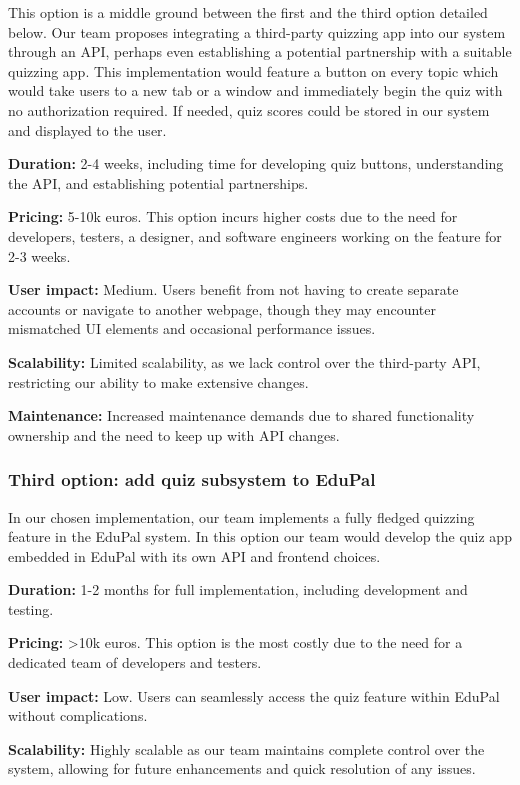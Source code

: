 \documentclass[
    english, %
]{VUMIFPSkursinis}
\begin{document}
This option is a middle ground between the first and the third option detailed below. Our team proposes integrating a third-party quizzing app into our system through an API, perhaps even establishing a potential partnership with a suitable quizzing app. This implementation would feature a button on every topic which would take users to a new tab or a window and immediately begin the quiz with no authorization required. If needed, quiz scores could be stored in our system and displayed to the user. 

\textbf{Duration:} 2-4 weeks, including time for developing quiz buttons, understanding the API, and establishing potential partnerships.

\textbf{Pricing:} 5-10k euros. This option incurs higher costs due to the need for developers, testers, a designer, and software engineers working on the feature for 2-3 weeks.

\textbf{User impact:} Medium. Users benefit from not having to create separate accounts or navigate to another webpage, though they may encounter mismatched UI elements and occasional performance issues.

\textbf{Scalability:} Limited scalability, as we lack control over the third-party API, restricting our ability to make extensive changes.

\textbf{Maintenance:} Increased maintenance demands due to shared functionality ownership and the need to keep up with API changes.

\subsubsection{Third option: add quiz subsystem to EduPal}

In our chosen implementation, our team implements a fully fledged quizzing feature in the EduPal system. In this option our team would develop the quiz app embedded in EduPal with its own API and frontend choices. 

\textbf{Duration:} 1-2 months for full implementation, including development and testing.

\textbf{Pricing:} >10k euros. This option is the most costly due to the need for a dedicated team of developers and testers.

\textbf{User impact:} Low. Users can seamlessly access the quiz feature within EduPal without complications.

\textbf{Scalability:} Highly scalable as our team maintains complete control over the system, allowing for future enhancements and quick resolution of any issues.
\end{document}
